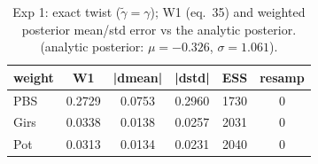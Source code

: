 \begin{table}[ht]
\centering
\caption{Exp 1: exact twist ($\tilde\gamma = \gamma$); W1 (eq.~35) and weighted posterior mean/std error vs the analytic posterior. (analytic posterior: $\mu=-0.326$, $\sigma=1.061$).}
\label{tab:toy_1}
\begin{tabular}{lccccc}
\toprule
weight & W1 & |dmean| & |dstd| & ESS & resamp \\
\midrule
PBS & 0.2729 & 0.0753 & 0.2960 & 1730 & 0 \\
Girs & 0.0338 & 0.0138 & 0.0257 & 2031 & 0 \\
Pot & 0.0313 & 0.0134 & 0.0231 & 2040 & 0 \\
\bottomrule
\end{tabular}
\end{table}
